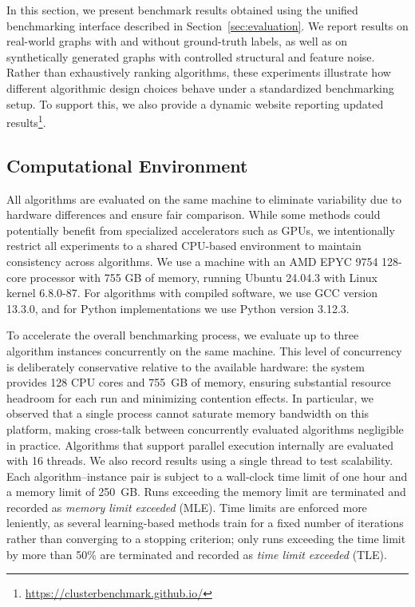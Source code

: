 \documentclass[../paper.tex]{subfiles}
\begin{document}


In this section, we present benchmark results obtained using the unified benchmarking interface described in Section~\ref{sec:evaluation}. We report results on real-world graphs with and without ground-truth labels, as well as on synthetically generated graphs with controlled structural and feature noise. Rather than exhaustively ranking algorithms, these experiments illustrate how different algorithmic design choices behave under a standardized benchmarking setup. To support this, we also provide a dynamic website reporting updated results\footnote{\url{https://clusterbenchmark.github.io/}}.

\subsection{Computational Environment}

All algorithms are evaluated on the same machine to eliminate variability due to hardware differences and ensure fair comparison. While some methods could potentially benefit from specialized accelerators such as GPUs, we intentionally restrict all experiments to a shared CPU-based environment to maintain consistency across algorithms. We use a machine with an AMD EPYC 9754 128-core processor with 755 GB of memory, running Ubuntu 24.04.3 with Linux kernel 6.8.0-87. For algorithms with compiled software, we use GCC version 13.3.0, and for Python implementations we use Python version 3.12.3.

To accelerate the overall benchmarking process, we evaluate up to three algorithm instances concurrently on the same machine. This level of concurrency is deliberately conservative relative to the available hardware: the system provides 128 CPU cores and 755~GB of memory, ensuring substantial resource headroom for each run and minimizing contention effects. In particular, we observed that a single process cannot saturate memory bandwidth on this platform, making cross-talk between concurrently evaluated algorithms negligible in practice. Algorithms that support parallel execution internally are evaluated with 16 threads. We also record results using a single thread to test scalability. Each algorithm–instance pair is subject to a wall-clock time limit of one hour and a memory limit of 250~GB. Runs exceeding the memory limit are terminated and recorded as \emph{memory limit exceeded} (MLE). Time limits are enforced more leniently, as several learning-based methods train for a fixed number of iterations rather than converging to a stopping criterion; only runs exceeding the time limit by more than 50\% are terminated and recorded as \emph{time limit exceeded} (TLE).
\end{document}
